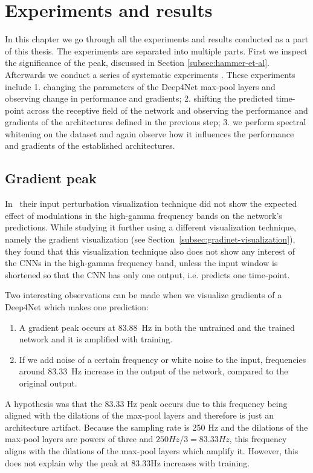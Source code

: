 \chapter{Experiments and results}
\label{ch:exp}
In this chapter we go through all the experiments and results conducted as a part of this thesis. 
The experiments are separated into multiple parts. 
First we inspect the significance of the peak, discussed in Section \ref{subsec:hammer-et-al}.
Afterwards we conduct a series of systematic experiments .
These experiments include 1. changing the parameters of the Deep4Net max-pool layers and observing change in performance and gradients; 2. shifting the predicted time-point across the receptive field of the network and observing the performance and gradients of the architectures defined in the previous step; 3. we perform spectral whitening on the dataset and again observe how it influences the performance and gradients of the established architectures. 

\section{Gradient peak}\label{sec:gradient-peak}
In~\cite{Hammer-2021} their input perturbation visualization technique did not show the expected effect of modulations in the high-gamma frequency bands on the network's predictions.
While studying it further using a different visualization technique, namely the gradient visualization (see Section~\ref{subsec:gradinet-visualization}), they found that this visualization technique also does not show any interest of the CNNs in the high-gamma frequency band, unless the input window is shortened so that the CNN has only one output, i.e. predicts one time-point.

Two interesting observations can be made when we visualize gradients of a Deep4Net which makes one prediction:
\begin{enumerate}
\item A gradient peak occurs at 83.88~Hz in both the untrained and the trained network and it is amplified with training.
\item If we add noise of a certain frequency or white noise to the input, frequencies around 83.33~Hz increase in the output of the network, compared to the original output.
\end{enumerate}

A hypothesis was that the 83.33 Hz peak occurs due to this frequency being aligned with the dilations of the max-pool layers and therefore is just an architecture artifact.
Because the sampling rate is 250 Hz and the dilations of the max-pool layers are powers of three and $250 Hz / 3 = 83.33 Hz$, this frequency aligns with the dilations of the max-pool layers which amplify it.
However, this does not explain why the peak at 83.33Hz increases with training.

